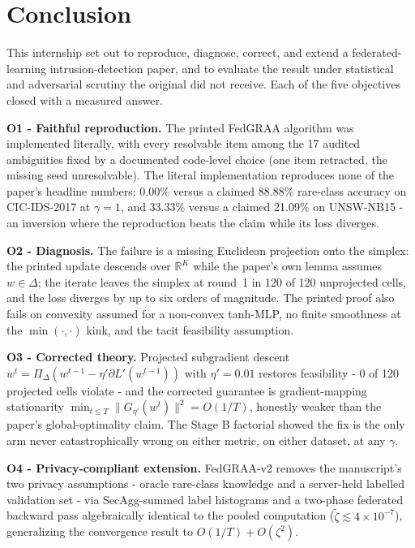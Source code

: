 \documentclass[11pt,a4paper]{report}
\begin{document}
\chapter{Conclusion}
\label{ch:conclusion}
\enlargethispage{2\baselineskip}

{\sloppy
This internship set out to reproduce, diagnose, correct, and extend a
federated-learning intrusion-detection paper, and to evaluate the result
under statistical and adversarial scrutiny the original did not receive.
Each of the five objectives closed with a measured answer.\par}

\textbf{O1 - Faithful reproduction.} The printed FedGRAA algorithm was
implemented literally, with every resolvable item among the 17 audited
ambiguities fixed by a documented code-level choice (one item retracted,
the missing seed unresolvable). The literal implementation reproduces none of the
paper's headline numbers: 0.00\% versus a claimed 88.88\% rare-class
accuracy on CIC-IDS-2017 at $\gamma = 1$, and 33.33\% versus a claimed
21.09\% on UNSW-NB15 - an inversion where the reproduction beats the
claim while its loss diverges.

\textbf{O2 - Diagnosis.} The failure is a missing Euclidean projection
onto the simplex: the printed update descends over $\mathbb{R}^K$ while
the paper's own lemma assumes $w \in \Delta$; the iterate leaves the
simplex at round~1 in 120 of 120 unprojected cells, and the loss diverges
by up to six orders of magnitude. The printed proof also fails on
convexity assumed for a non-convex tanh-MLP, no finite smoothness at the
$\min(\cdot,\cdot)$ kink, and the tacit feasibility assumption.

\textbf{O3 - Corrected theory.} Projected subgradient descent
$w^t = \Pi_\Delta(w^{t-1} - \eta' \partial L'(w^{t-1}))$ with
$\eta' = 0.01$ restores feasibility - 0 of 120 projected cells violate -
and the corrected guarantee is gradient-mapping stationarity
$\min_{t \leq T} \|G_{\eta'}(w^t)\|^2 = O(1/T)$, honestly weaker than the
paper's global-optimality claim. The Stage B factorial showed the fix is
the only arm never catastrophically wrong on either metric, on either
dataset, at any $\gamma$.

\textbf{O4 - Privacy-compliant extension.} FedGRAA-v2 removes the
manuscript's two privacy assumptions - oracle rare-class knowledge and a
server-held labelled validation set - via SecAgg-summed label histograms
and a two-phase federated backward pass algebraically identical to the
pooled computation ($\tilde{\zeta} \lesssim 4\times10^{-7}$), generalizing
the convergence result to $O(1/T) + O(\zeta^2)$.
\end{document}
